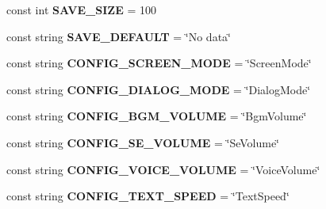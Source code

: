 \begin{DoxyCompactItemize}
\item 
const int {\bfseries S\+A\+V\+E\+\_\+\+S\+I\+ZE} = 100\hypertarget{classdoki_unity_1_1_game_constants_a03179a060a47345464eb77e3f337f362}{}\label{classdoki_unity_1_1_game_constants_a03179a060a47345464eb77e3f337f362}

\item 
const string {\bfseries S\+A\+V\+E\+\_\+\+D\+E\+F\+A\+U\+LT} = \char`\"{}No data\char`\"{}\hypertarget{classdoki_unity_1_1_game_constants_a0ffaf38dbe30c7dbd7d3fba1c3c064b7}{}\label{classdoki_unity_1_1_game_constants_a0ffaf38dbe30c7dbd7d3fba1c3c064b7}

\item 
const string {\bfseries C\+O\+N\+F\+I\+G\+\_\+\+S\+C\+R\+E\+E\+N\+\_\+\+M\+O\+DE} = \char`\"{}Screen\+Mode\char`\"{}\hypertarget{classdoki_unity_1_1_game_constants_a1263221de15f4256850b327ad92ef579}{}\label{classdoki_unity_1_1_game_constants_a1263221de15f4256850b327ad92ef579}

\item 
const string {\bfseries C\+O\+N\+F\+I\+G\+\_\+\+D\+I\+A\+L\+O\+G\+\_\+\+M\+O\+DE} = \char`\"{}Dialog\+Mode\char`\"{}\hypertarget{classdoki_unity_1_1_game_constants_af9d3099b71c53733842e3f7e189f568d}{}\label{classdoki_unity_1_1_game_constants_af9d3099b71c53733842e3f7e189f568d}

\item 
const string {\bfseries C\+O\+N\+F\+I\+G\+\_\+\+B\+G\+M\+\_\+\+V\+O\+L\+U\+ME} = \char`\"{}Bgm\+Volume\char`\"{}\hypertarget{classdoki_unity_1_1_game_constants_a14fffa012accdd9fcdc58a31c2ce5b48}{}\label{classdoki_unity_1_1_game_constants_a14fffa012accdd9fcdc58a31c2ce5b48}

\item 
const string {\bfseries C\+O\+N\+F\+I\+G\+\_\+\+S\+E\+\_\+\+V\+O\+L\+U\+ME} = \char`\"{}Se\+Volume\char`\"{}\hypertarget{classdoki_unity_1_1_game_constants_ad9a8468cca354d616750114a6784d98b}{}\label{classdoki_unity_1_1_game_constants_ad9a8468cca354d616750114a6784d98b}

\item 
const string {\bfseries C\+O\+N\+F\+I\+G\+\_\+\+V\+O\+I\+C\+E\+\_\+\+V\+O\+L\+U\+ME} = \char`\"{}Voice\+Volume\char`\"{}\hypertarget{classdoki_unity_1_1_game_constants_ad79035f2bc024ebeededa6060db46945}{}\label{classdoki_unity_1_1_game_constants_ad79035f2bc024ebeededa6060db46945}

\item 
const string {\bfseries C\+O\+N\+F\+I\+G\+\_\+\+T\+E\+X\+T\+\_\+\+S\+P\+E\+ED} = \char`\"{}Text\+Speed\char`\"{}\hypertarget{classdoki_unity_1_1_game_constants_a5112abd85997cc2aa58e947169032077}{}\label{classdoki_unity_1_1_game_constants_a5112abd85997cc2aa58e947169032077}


\end{DoxyCompactItemize}
